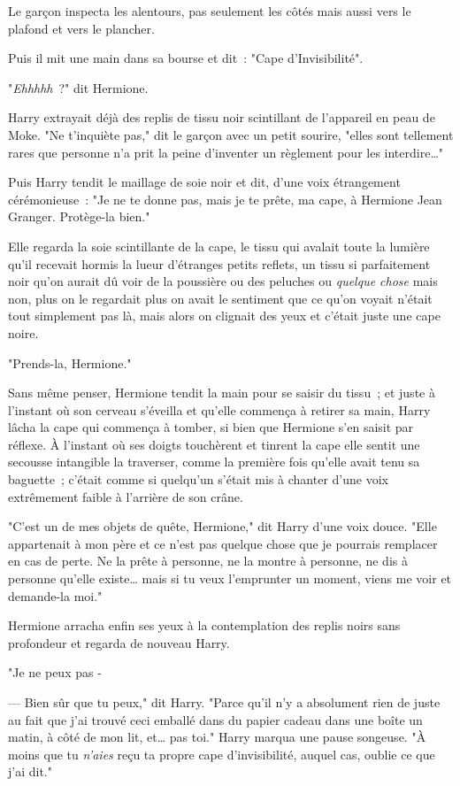 Le garçon inspecta les alentours, pas seulement les côtés mais aussi vers le plafond et vers le plancher.

Puis il mit une main dans sa bourse et dit~: "Cape d'Invisibilité".

"\emph{Ehhhhh}~?" dit Hermione.

Harry extrayait déjà des replis de tissu noir scintillant de l'appareil en peau de Moke. "Ne t'inquiète pas," dit le garçon avec un petit sourire, "elles sont tellement rares que personne n'a prit la peine d'inventer un règlement pour les interdire…"

Puis Harry tendit le maillage de soie noir et dit, d'une voix étrangement cérémonieuse~: "Je ne te donne pas, mais je te prête, ma cape, à Hermione Jean Granger. Protège-la bien."

Elle regarda la soie scintillante de la cape, le tissu qui avalait toute la lumière qu'il recevait hormis la lueur d'étranges petits reflets, un tissu si parfaitement noir qu'on aurait dû voir de la poussière ou des peluches ou \emph{quelque chose} mais non, plus on le regardait plus on avait le sentiment que ce qu'on voyait n'était tout simplement pas là, mais alors on clignait des yeux et c'était juste une cape noire.

"Prends-la, Hermione."

Sans même penser, Hermione tendit la main pour se saisir du tissu~; et juste à l'instant où son cerveau s'éveilla et qu'elle commença à retirer sa main, Harry lâcha la cape qui commença à tomber, si bien que Hermione s'en saisit par réflexe. À l'instant où ses doigts touchèrent et tinrent la cape elle sentit une secousse intangible la traverser, comme la première fois qu'elle avait tenu sa baguette~; c'était comme si quelqu'un s'était mis à chanter d'une voix extrêmement faible à l'arrière de son crâne.

"C'est un de mes objets de quête, Hermione," dit Harry d'une voix douce. "Elle appartenait à mon père et ce n'est pas quelque chose que je pourrais remplacer en cas de perte. Ne la prête à personne, ne la montre à personne, ne dis à personne qu'elle existe… mais si tu veux l'emprunter un moment, viens me voir et demande-la moi."

Hermione arracha enfin ses yeux à la contemplation des replis noirs sans profondeur et regarda de nouveau Harry.

"Je ne peux pas -

--- Bien sûr que tu peux," dit Harry. "Parce qu'il n'y a absolument rien de juste au fait que j'ai trouvé ceci emballé dans du papier cadeau dans une boîte un matin, à côté de mon lit, et… pas toi." Harry marqua une pause songeuse. "À moins que tu \emph{n'aies} reçu ta propre cape d'invisibilité, auquel cas, oublie ce que j'ai dit."

